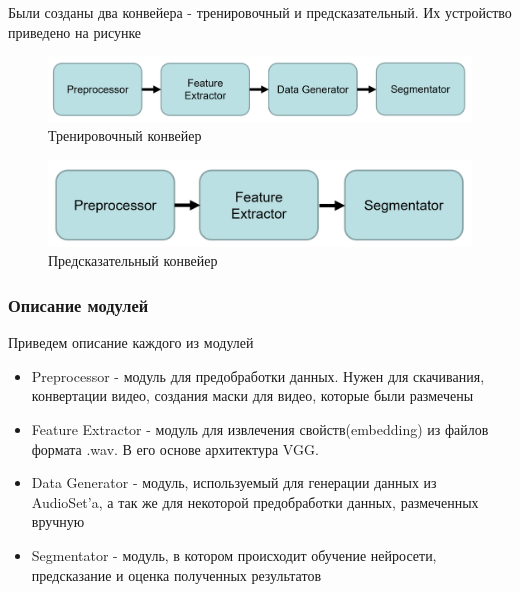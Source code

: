 \documentclass[main.tex]{subfiles}
\begin{document}
Были созданы два конвейера - тренировочный и предсказательный. Их устройство приведено на рисунке
\begin{figure}[H]
	\begin{center}
		\includegraphics[scale=0.5]{images/train.png}
		\caption{Тренировочный конвейер}
	\end{center}
\end{figure}

\begin{figure}[H]
	\begin{center}
		\includegraphics[scale=0.5]{images/predict.png}
		\caption{Предсказательный конвейер}
	\end{center}
\end{figure}

\subsubsection{Описание модулей}
Приведем описание каждого из модулей
\begin{itemize}
    \item Preprocessor - модуль для предобработки данных. Нужен для скачивания, конвертации видео, создания маски для видео, которые были размечены
    \item Feature Extractor - модуль для извлечения свойств(embedding) из файлов формата  .wav. В его основе архитектура VGG.
    \item Data Generator - модуль, используемый для генерации данных из AudioSet'a, а так же для некоторой предобработки данных, размеченных вручную
    \item Segmentator - модуль, в котором происходит обучение нейросети, предсказание и оценка полученных результатов
\end{itemize}
\end{document}
